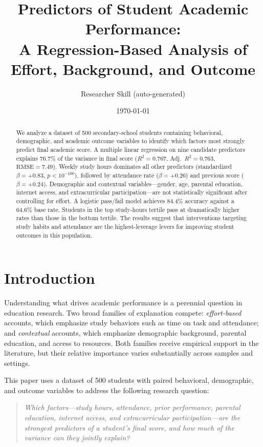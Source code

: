 \documentclass[11pt]{article}
\title{Predictors of Student Academic Performance:\\
A Regression-Based Analysis of Effort, Background, and Outcome}
\author{Researcher Skill (auto-generated)}
\date{\today}
\begin{document}
\maketitle

\begin{abstract}
We analyze a dataset of 500 secondary-school students containing behavioral, demographic, and academic outcome variables to identify which factors most strongly predict final academic score. A multiple linear regression on nine candidate predictors explains 76.7\% of the variance in final score ($R^2=0.767$, Adj.\ $R^2=0.763$, $\text{RMSE}=7.49$). Weekly study hours dominates all other predictors (standardized $\beta=+0.83$, $p<10^{-100}$), followed by attendance rate ($\beta=+0.26$) and previous score ($\beta=+0.24$). Demographic and contextual variables---gender, age, parental education, internet access, and extracurricular participation---are not statistically significant after controlling for effort. A logistic pass/fail model achieves 84.4\% accuracy against a 64.6\% base rate. Students in the top study-hours tertile pass at dramatically higher rates than those in the bottom tertile. The results suggest that interventions targeting study habits and attendance are the highest-leverage levers for improving student outcomes in this population.
\end{abstract}

\section{Introduction}
Understanding what drives academic performance is a perennial question in education research. Two broad families of explanation compete: \emph{effort-based} accounts, which emphasize study behaviors such as time on task and attendance; and \emph{contextual} accounts, which emphasize demographic background, parental education, and access to resources. Both families receive empirical support in the literature, but their relative importance varies substantially across samples and settings.

This paper uses a dataset of 500 students with paired behavioral, demographic, and outcome variables to address the following research question:

\begin{quote}\itshape
Which factors---study hours, attendance, prior performance, parental education, internet access, and extracurricular participation---are the strongest predictors of a student's final score, and how much of the variance can they jointly explain?
\end{quote}
\end{document}
